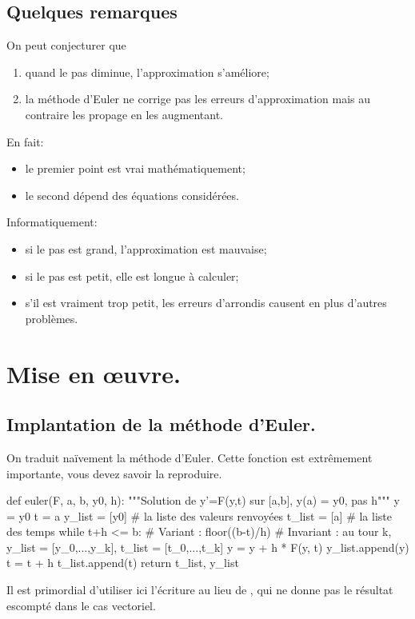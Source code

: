\subsection{Quelques remarques}
On peut conjecturer que
\begin{enumerate}
\item quand le pas diminue, l'approximation s'améliore;
\item la méthode d'Euler ne corrige pas les erreurs d'approximation
  mais au contraire les propage en les augmentant.
\end{enumerate}

En fait:
\begin{itemize}
\item le premier point est vrai mathématiquement;
\item le second dépend des équations considérées.
\end{itemize}

Informatiquement:
\begin{itemize}
\item si le pas est grand, l'approximation est mauvaise;
\item si le pas est petit, elle est longue à calculer;
\item s'il est vraiment trop petit, les erreurs d'arrondis causent en plus d'autres problèmes.
\end{itemize}

\section{Mise en œuvre.}

\subsection{Implantation de la méthode d'Euler.}

On traduit naïvement la méthode d'Euler. Cette fonction est extrêmement importante, vous devez savoir la reproduire.

\begin{pyverbatim}
def euler(F, a, b, y0, h):
    """Solution de y'=F(y,t) sur [a,b], y(a) = y0, pas h"""
    y = y0
    t = a
    y_list = [y0] # la liste des valeurs renvoyées
    t_list = [a] # la liste des temps
    while t+h <= b:
        # Variant : floor((b-t)/h)
        # Invariant : au tour k, y_list = [y_0,...,y_k], t_list = [t_0,...,t_k]
        y = y + h * F(y, t)
        y_list.append(y)
        t = t + h
        t_list.append(t)
    return t_list, y_list
\end{pyverbatim}
\begin{rem}
  Il est primordial d'utiliser ici l'écriture  au lieu de  , qui ne donne pas le résultat escompté dans le cas vectoriel. 
\end{rem}

